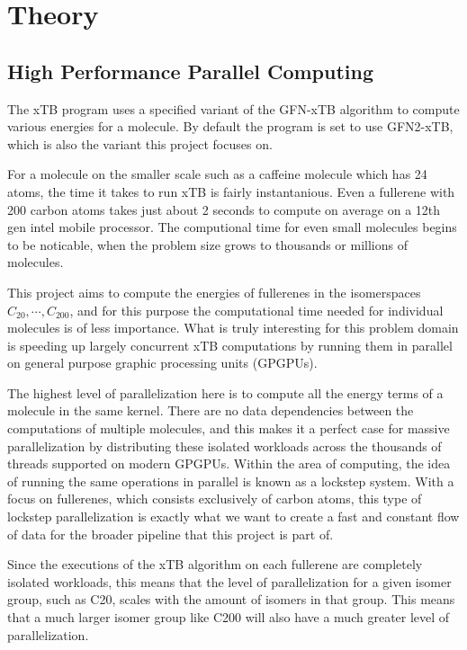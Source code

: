 \section{Theory}

\subsection{High Performance Parallel Computing}

The xTB program uses a specified variant of the GFN-xTB algorithm to compute various energies for a molecule. By default the program is set to use GFN2-xTB, which is also the variant this project focuses on.

For a molecule on the smaller scale such as a caffeine molecule which has 24 atoms, the time it takes to run xTB is fairly instantanious. Even a fullerene with 200 carbon atoms takes just about 2 seconds to compute on average on a 12th gen intel mobile processor. The computional time for even small molecules begins to be noticable, when the problem size grows to thousands or millions of molecules.

This project aims to compute the energies of fullerenes in the isomerspaces \(C_{20}, \cdots, C_{200} \), and for this purpose the computational time needed for individual molecules is of less importance. What is truly interesting for this problem domain is speeding up largely concurrent xTB computations by running them in parallel on general purpose graphic processing units (GPGPUs).

The highest level of parallelization here is to compute all the energy terms of a molecule in the same kernel. There are no data dependencies between the computations of multiple molecules, and this makes it a perfect case for massive parallelization by distributing these isolated workloads across the thousands of threads supported on modern GPGPUs.
Within the area of computing, the idea of running the same operations in parallel is known as a lockstep system. With a focus on fullerenes, which consists exclusively of carbon atoms, this type of lockstep parallelization is exactly what we want to create a fast and constant flow of data for the broader pipeline that this project is part of.

Since the executions of the xTB algorithm on each fullerene are completely isolated workloads, this means that the level of parallelization for a given isomer group, such as C20, scales with the amount of isomers in that group. This means that a much larger isomer group like C200 will also have a much greater level of parallelization.

